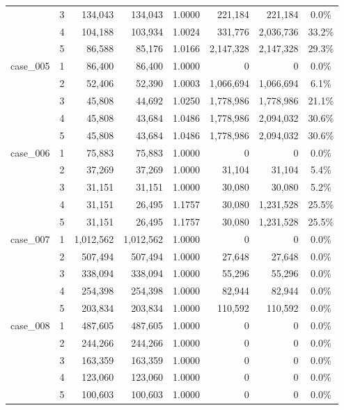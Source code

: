 \begin{footnotesize}
\begin{longtable}{l c rr c rr c}
 & 3 & 134{,}043 & 134{,}043 & 1.0000 & 221{,}184 & 221{,}184 & 0.0\% \\
 & 4 & 104{,}188 & 103{,}934 & 1.0024 & 331{,}776 & 2{,}036{,}736 & 33.2\% \\
 & 5 & 86{,}588 & 85{,}176 & 1.0166 & 2{,}147{,}328 & 2{,}147{,}328 & 29.3\% \\
\addlinespace[2pt]
case\_005 & 1 & 86{,}400 & 86{,}400 & 1.0000 & 0 & 0 & 0.0\% \\
 & 2 & 52{,}406 & 52{,}390 & 1.0003 & 1{,}066{,}694 & 1{,}066{,}694 & 6.1\% \\
 & 3 & 45{,}808 & 44{,}692 & 1.0250 & 1{,}778{,}986 & 1{,}778{,}986 & 21.1\% \\
 & 4 & 45{,}808 & 43{,}684 & 1.0486 & 1{,}778{,}986 & 2{,}094{,}032 & 30.6\% \\
 & 5 & 45{,}808 & 43{,}684 & 1.0486 & 1{,}778{,}986 & 2{,}094{,}032 & 30.6\% \\
\addlinespace[2pt]
case\_006 & 1 & 75{,}883 & 75{,}883 & 1.0000 & 0 & 0 & 0.0\% \\
 & 2 & 37{,}269 & 37{,}269 & 1.0000 & 31{,}104 & 31{,}104 & 5.4\% \\
 & 3 & 31{,}151 & 31{,}151 & 1.0000 & 30{,}080 & 30{,}080 & 5.2\% \\
 & 4 & 31{,}151 & 26{,}495 & 1.1757 & 30{,}080 & 1{,}231{,}528 & 25.5\% \\
 & 5 & 31{,}151 & 26{,}495 & 1.1757 & 30{,}080 & 1{,}231{,}528 & 25.5\% \\
\addlinespace[2pt]
case\_007 & 1 & 1{,}012{,}562 & 1{,}012{,}562 & 1.0000 & 0 & 0 & 0.0\% \\
 & 2 & 507{,}494 & 507{,}494 & 1.0000 & 27{,}648 & 27{,}648 & 0.0\% \\
 & 3 & 338{,}094 & 338{,}094 & 1.0000 & 55{,}296 & 55{,}296 & 0.0\% \\
 & 4 & 254{,}398 & 254{,}398 & 1.0000 & 82{,}944 & 82{,}944 & 0.0\% \\
 & 5 & 203{,}834 & 203{,}834 & 1.0000 & 110{,}592 & 110{,}592 & 0.0\% \\
\addlinespace[2pt]
case\_008 & 1 & 487{,}605 & 487{,}605 & 1.0000 & 0 & 0 & 0.0\% \\
 & 2 & 244{,}266 & 244{,}266 & 1.0000 & 0 & 0 & 0.0\% \\
 & 3 & 163{,}359 & 163{,}359 & 1.0000 & 0 & 0 & 0.0\% \\
 & 4 & 123{,}060 & 123{,}060 & 1.0000 & 0 & 0 & 0.0\% \\
 & 5 & 100{,}603 & 100{,}603 & 1.0000 & 0 & 0 & 0.0\% \\

\end{longtable}
\end{footnotesize}

